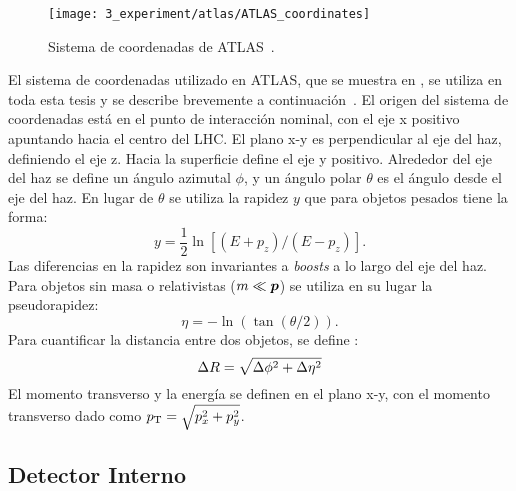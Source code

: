 \begin{figure}[ht!]
    \centering
    \texttt{[image: 3\_experiment/atlas/ATLAS\_coordinates]}
    \caption{Sistema de coordenadas de \ac{ATLAS}~\cite{ATLAS-Diagram}.}
    \label{fig:atlas:atlas:atlas_coordinates}
\end{figure}

El sistema de coordenadas utilizado en \ac{ATLAS}, que se muestra en \Fig{\ref{fig:atlas:atlas:atlas_coordinates}}, se utiliza en toda esta tesis y se describe brevemente a continuación~\cite{ATLAS}.
El origen del sistema de coordenadas está en el punto de interacción nominal, con el eje x positivo apuntando hacia el centro del \ac{LHC}. El plano x-y es perpendicular al eje del haz, definiendo el eje z. Hacia la superficie define el eje y positivo. Alrededor del eje del haz se define un ángulo azimutal $\phi$, y un ángulo polar $\theta$ es el ángulo desde el eje del haz. En lugar de $\theta$ se utiliza la rapidez $y$ que para objetos pesados tiene la forma:
\begin{equation}
    y = \frac{1}{2} \ln[(E+p_z)/(E-p_z)].
\end{equation}
Las diferencias en la rapidez son invariantes a \textit{boosts} a lo largo del eje del haz. Para objetos sin masa o relativistas ($m \ll \vb*{p}$) se utiliza en su lugar la pseudorapidez:
\begin{equation}
    \eta = -\ln(\tan(\theta/2)).
\end{equation}
Para cuantificar la distancia entre dos objetos, se define \DeltaR:
\begin{equation}
    \Delta R = \sqrt{\Delta\phi^2 + \Delta\eta^2}
\end{equation}
El momento transverso y la energía se definen en el plano x-y, con el momento transverso dado como $p_{\text{T}} = \sqrt{p_x^2 +p_y^2}$.






\subsection{Detector Interno}
\label{subsec:atlas:atlas:id}

